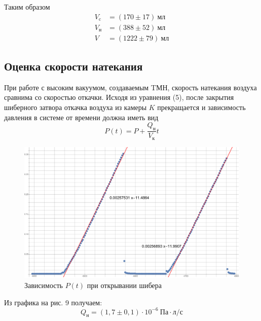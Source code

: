 \documentclass[a4paper,12pt]{article}
\theoremstyle{plain} %
\theoremstyle{definition} %
\theoremstyle{remark} %
\begin{document}
\noindent Таким образом
\begin{align*}
V_\text{c} &= (170 \pm 17)\ \text{мл}\\
V_\text{н} &= (388\pm 52)\ \text{мл} \\
V &= (1222 \pm 79)\ \text{мл}
\end{align*}
\subsection{Оценка скорости натекания}
При работе с высоким вакуумом, создаваемым TМН, скорость натекания воздуха сравнима со скоростью откачки. Исходя из уравнения (5), после закрытия шиберного затвора откачка воздуха из камеры $K$ прекращается и зависимость давления в системе от времени должна иметь вид
\[ P(t) = P + \frac{Q_\text{н}}{V_\text{к}}t\]
\begin{figure}[H]
	\begin{center}
		\includegraphics[width=\linewidth]{12}
		\caption{Зависимость $P(t)$ при открывании шибера}
	\end{center}
\end{figure}
Из графика на рис. 9 получаем:
\[Q_\text{н} = (1,7\pm0,1)\cdot10^{-6}\ \text{Па}\cdot \text{л}/\text{с}\]
\end{document}
